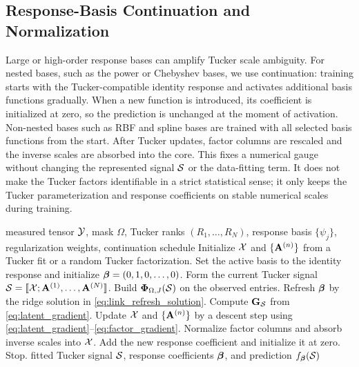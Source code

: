 \subsection{Response-Basis Continuation and Normalization}

Large or high-order response bases can amplify Tucker scale ambiguity. For
nested bases, such as the power or Chebyshev bases, we use continuation:
training starts with the Tucker-compatible identity response and activates
additional basis functions gradually. When a new function is introduced, its coefficient
is initialized at zero, so the prediction is unchanged at the moment of
activation. Non-nested bases such as RBF and spline bases are trained with all
selected basis functions from the start. After Tucker updates, factor
columns are rescaled and the inverse scales are absorbed into the core. This
fixes a numerical gauge without changing the represented signal $\mathcal{S}$ or the
data-fitting term. It does not make the Tucker factors identifiable in a strict
statistical sense; it only keeps the Tucker parameterization and response
coefficients on stable numerical scales during training.

\begin{algorithm}[!t]
  \footnotesize
  \caption{Alternating recovery for NTD-PL and other finite response bases.}
  \label{alg:alternating_recovery}
  \begin{algorithmic}[1]
    \REQUIRE measured tensor $\mathcal{Y}$, mask $\Omega$, Tucker ranks
    $(R_1,\ldots,R_N)$, response basis $\{\psi_j\}$, regularization
    weights, continuation schedule
    \STATE Initialize $\mathcal{X}$ and $\{\mathbf{A}^{(n)}\}$ from a Tucker fit or a random
    Tucker factorization.
    \STATE Set the active basis to the identity response and initialize
    $\boldsymbol{\beta}=(0,1,0,\ldots,0)$.
      \STATE Form the current Tucker signal
      $\mathcal{S}=[\![ \mathcal{X}; \mathbf{A}^{(1)},\ldots,\mathbf{A}^{(N)} ]\!]$.
      \STATE Build $\boldsymbol{\Phi}_{\Omega,J}(\mathcal{S})$ on the observed entries.
      \STATE Refresh $\boldsymbol{\beta}$ by the ridge solution in
      \eqref{eq:link_refresh_solution}.
      \STATE Compute $\mathbf{G}_{\mathcal{S}}$ from \eqref{eq:latent_gradient}.
      \STATE Update $\mathcal{X}$ and $\{\mathbf{A}^{(n)}\}$ by a descent step using
      \eqref{eq:latent_gradient}--\eqref{eq:factor_gradient}.
      \STATE Normalize factor columns and absorb inverse scales into $\mathcal{X}$.
        \STATE Add the new response coefficient and initialize it at zero.
      \ENDIF
        \STATE Stop.
      \ENDIF
    \ENDFOR
    \ENSURE fitted Tucker signal $\mathcal{S}$, response coefficients $\boldsymbol{\beta}$, and
    prediction $f_{\boldsymbol{\beta}}(\mathcal{S})$
  \end{algorithmic}
\end{algorithm}

